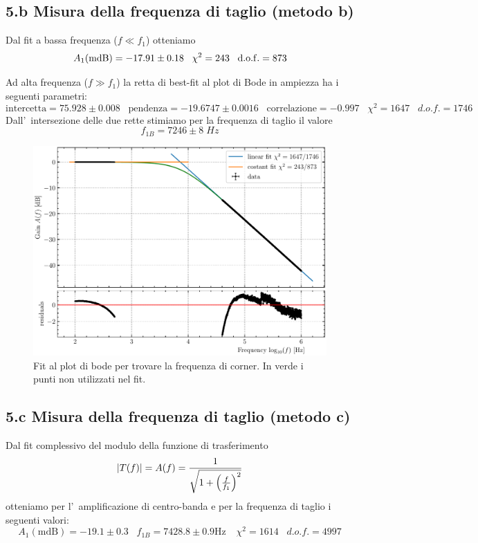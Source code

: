 \documentclass[10pt,a4paper]{article}
\begin{document}
\subsection*{5.b Misura della frequenza di taglio (metodo b)}
Dal fit a bassa frequenza ($f\ll f_1$) otteniamo
\[
A_1(\rm mdB) = -17.91 \pm 0.18 \;\;\; \chi^2 = 243 \;\;\; d.o.f. = 873
\]

Ad alta frequenza ($f \gg f_1$) la retta di best-fit al plot di Bode in 
ampiezza ha i seguenti parametri:
\[
\mathrm{intercetta} = 75.928 \pm 0.008 \;\;\;\mathrm{pendenza} = -19.6747 \pm 
0.0016 \;\;\;\mathrm{correlazione} 
= -0.997 \;\;\; \chi^2 = 1647 \;\;\; d.o.f. = 1746
\]
Dall'~intersezione delle due rette stimiamo per la frequenza di taglio il valore
\[
f_{1B} = 7246 \pm 8 \; \si{Hz}
\]

\begin{figure}[htbp]
\centering
\includegraphics[scale=0.7]{corner}
\caption{Fit al plot di bode per trovare la frequenza di corner. In verde i
punti non utilizzati nel fit. \label{fig: corner}}
\end{figure}

\subsection*{5.c Misura della frequenza di taglio (metodo c)}
Dal fit complessivo del modulo della funzione di trasferimento
\begin{equation}\label{eq: lpfgain}
\left| T(f) \right| = A(f) = \frac{1}{\sqrt{1 + \left(\frac{f}{f_1}\right)^2}}
\end{equation}
otteniamo per l'~amplificazione di centro-banda e per la frequenza di taglio i 
seguenti valori:
\[
A_1 (\mathrm{mdB}) = -19.1 \pm 0.3 \;\;\; f_{1B} = 7428.8 \pm 0.9 \si{\Hz}
\;\;\;\ \chi^2 = 1614 \;\;\; d.o.f.= 4997
\]
\end{document}
